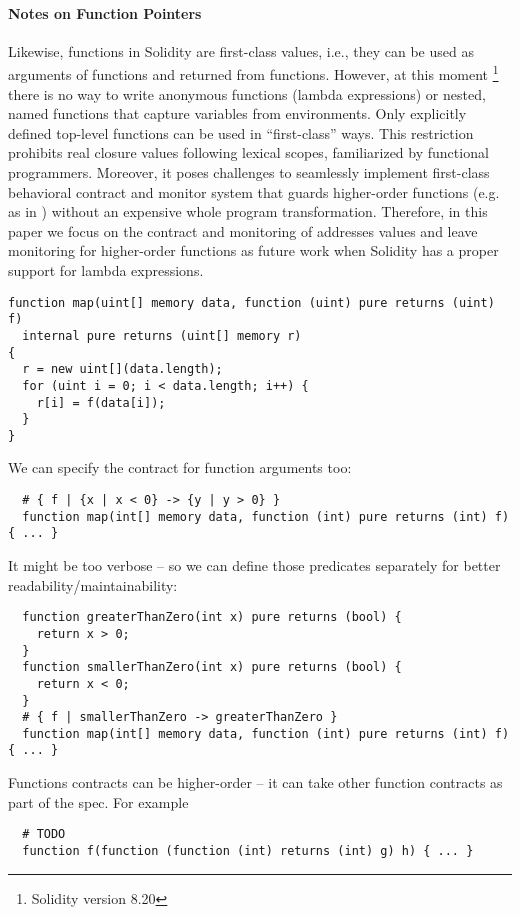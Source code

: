 \paragraph{Notes on Function Pointers}
Likewise, functions in Solidity are first-class values, i.e., they can be used
as arguments of functions and returned from functions.
However, at this moment \footnote{Solidity version 8.20} there is no way to
write anonymous functions (lambda expressions) or nested, named functions that
capture variables from environments.
Only explicitly defined top-level functions can be used in ``first-class'' ways.
This restriction prohibits real closure values following lexical scopes,
familiarized by functional programmers.
Moreover, it poses challenges to seamlessly implement first-class behavioral
contract and monitor system that guards higher-order functions (e.g. as in
\cite{DBLP:conf/icfp/FindlerF02}) without an expensive whole program
transformation.
Therefore, in this paper we focus on the contract and monitoring of addresses
values and leave monitoring for higher-order functions as future work when
Solidity has a proper support for lambda expressions.

\iffalse
	\begin{lstlisting}
function map(uint[] memory data, function (uint) pure returns (uint) f)
  internal pure returns (uint[] memory r)
{
  r = new uint[](data.length);
  for (uint i = 0; i < data.length; i++) {
    r[i] = f(data[i]);
  }
}
\end{lstlisting}

We can specify the contract for function arguments too:
\begin{lstlisting}
  # { f | {x | x < 0} -> {y | y > 0} }
  function map(int[] memory data, function (int) pure returns (int) f) { ... }
\end{lstlisting}
It might be too verbose -- so we can define those predicates separately for better readability/maintainability:
\begin{lstlisting}
  function greaterThanZero(int x) pure returns (bool) {
    return x > 0;
  }
  function smallerThanZero(int x) pure returns (bool) {
    return x < 0;
  }
  # { f | smallerThanZero -> greaterThanZero }
  function map(int[] memory data, function (int) pure returns (int) f) { ... }
\end{lstlisting}

Functions contracts can be higher-order --
it can take other function contracts
as part of the spec. For example
\begin{lstlisting}
  # TODO
  function f(function (function (int) returns (int) g) h) { ... }
\end{lstlisting}

